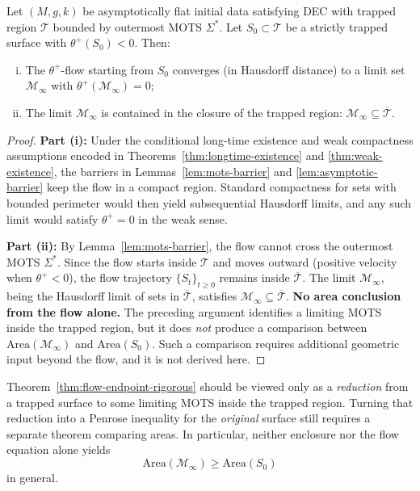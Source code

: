 \begin{theorem}
\label{thm:flow-endpoint-rigorous}
Let $(M, g, k)$ be asymptotically flat initial data satisfying DEC with trapped region $\mathcal{T}$ bounded by outermost MOTS $\Sigma^*$. Let $S_0 \subset \mathcal{T}$ be a strictly trapped surface with $\theta^+(S_0) < 0$. Then:
\begin{enumerate}[(i)]
    \item The $\theta^+$-flow starting from $S_0$ converges (in Hausdorff distance) to a limit set $\mathcal{M}_\infty$ with $\theta^+(\mathcal{M}_\infty) = 0$;
    \item The limit $\mathcal{M}_\infty$ is contained in the closure of the trapped region: $\mathcal{M}_\infty \subseteq \overline{\mathcal{T}}$.
\end{enumerate}
\end{theorem}

\begin{proof}
\textbf{Part (i):} Under the conditional long-time existence and weak compactness assumptions encoded in Theorems~\ref{thm:longtime-existence} and \ref{thm:weak-existence}, the barriers in Lemmas~\ref{lem:mots-barrier} and \ref{lem:asymptotic-barrier} keep the flow in a compact region. Standard compactness for sets with bounded perimeter would then yield subsequential Hausdorff limits, and any such limit would satisfy $\theta^+ = 0$ in the weak sense.

\textbf{Part (ii):} By Lemma~\ref{lem:mots-barrier}, the flow cannot cross the outermost MOTS $\Sigma^*$. Since the flow starts inside $\mathcal{T}$ and moves outward (positive velocity when $\theta^+ < 0$), the flow trajectory $\{S_t\}_{t \ge 0}$ remains inside $\overline{\mathcal{T}}$. The limit $\mathcal{M}_\infty$, being the Hausdorff limit of sets in $\overline{\mathcal{T}}$, satisfies $\mathcal{M}_\infty \subseteq \overline{\mathcal{T}}$.
\textbf{No area conclusion from the flow alone.}
The preceding argument identifies a limiting MOTS inside the trapped region, but it does \emph{not} produce a comparison between $\mathrm{Area}(\mathcal{M}_\infty)$ and $\mathrm{Area}(S_0)$. Such a comparison requires additional geometric input beyond the flow, and it is not derived here. \qedhere
\end{proof}

\begin{remark}
\label{rem:flow-variational-connection}
Theorem~\ref{thm:flow-endpoint-rigorous} should be viewed only as a \emph{reduction} from a trapped surface to some limiting MOTS inside the trapped region. Turning that reduction into a Penrose inequality for the \emph{original} surface still requires a separate theorem comparing areas. In particular, neither enclosure nor the flow equation alone yields
\[
    \mathrm{Area}(\mathcal{M}_\infty) \ge \mathrm{Area}(S_0)
\]
in general.
\end{remark}

